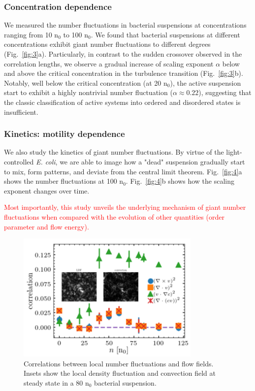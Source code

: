 \documentclass[twocolumn,aps,pre,amsmath,amssymb,floatfix,longbibliography]{revtex4-1}
\begin{document}
\subsubsection{Concentration dependence}
We measured the number fluctuations in bacterial suspensions at concentrations ranging from 10 n$_0$ to 100 n$_0$.
 We found that bacterial suspensions at different concentrations exhibit giant number fluctuations to different degrees (Fig.~\ref{fig:3}a). Particularly, in contrast to the sudden crossover observed in the correlation lengths, we observe a gradual increase of scaling exponent $\alpha$ below and above the critical concentration in the turbulence transition (Fig.~\ref{fig:3}b). Notably, well below the critical concentration (at 20 n$_0$), the active suspension start to exhibit a highly nontrivial number fluctuation ($\alpha\approx0.22$), suggesting that the classic classification of active systems into ordered and disordered states is insufficient.

\subsubsection{Kinetics: motility dependence}
We also study the kinetics of giant number fluctuations. By virtue of the light-controlled \textit{E. coli}, we are able to image how a "dead" suspension gradually start to mix, form patterns, and deviate from the central limit theorem. Fig.~\ref{fig:4}a shows the number fluctuations at 100 n$_0$. Fig.~\ref{fig:4}b shows how the scaling exponent changes over time.

\textcolor{red}{Most importantly, this study unveils the underlying mechanism of giant number fluctuations when compared with the evolution of other quantities (order parameter and flow energy).}

\begin{figure}[!]
\begin{center}
\includegraphics[width=0.8\textwidth]{GNF_figure-5-v1.png}
\caption[]{Correlations between local number fluctuations and flow fields. Insets show the local density fluctuation and convection field at steady state in a 80 n$_0$ bacterial suspension. }
\label{fig:5}
\end{center}
\end{figure}
\end{document}
